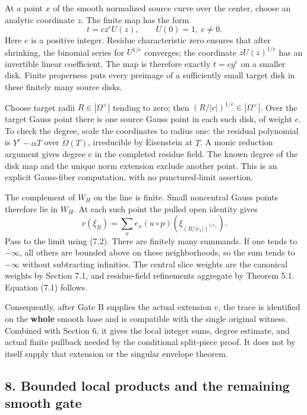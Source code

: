 \documentclass[
  10pt,
]{article}
\begin{document}
At a point \(x\) of the smooth normalized source curve over the center,
choose an analytic coordinate \(z\). The finite map has the form
\[t=c z^e U(z),\qquad U(0)=1,\ c\ne0.\] Here \(e\) is a positive
integer. Residue characteristic zero ensures that after shrinking, the
binomial series for \(U^{1/e}\) converges; the coordinate
\(zU(z)^{1/e}\) has an invertible linear coefficient. The map is
therefore exactly \(t=cy^e\) on a smaller disk. Finite properness puts
every preimage of a sufficiently small target disk in these finitely
many source disks.

Choose target radii \(R\in|\Omega^\times|\) tending to zero; then
\((R/|c|)^{1/e}\in|\Omega^\times|\). Over the target Gauss point there
is one source Gauss point in each such disk, of weight \(e\). To check
the degree, scale the coordinates to radius one: the residual polynomial
is \(Y^e-\alpha T\) over \(\widetilde\Omega(T)\), irreducible by
Eisenstein at \(T\). A monic reduction argument gives degree \(e\) in
the completed residue field. The known degree of the disk map and the
unique norm extension exclude another point. This is an explicit
Gauss-fiber computation, with no punctured-limit assertion.

The complement of \(W_H\) on the line is finite. Small noncentral Gauss
points therefore lie in \(W_H\). At each such point the pulled open
identity gives
\[v(\xi_R)=\sum_x e_x (u\circ p)(\xi_{(R/|c_x|)^{1/e_x}}).\tag{7.3}\]
Pass to the limit using (7.2). There are finitely many summands. If one
tends to \(-\infty\), all others are bounded above on these
neighborhoods, so the sum tends to \(-\infty\) without subtracting
infinities. The central slice weights are the canonical weights by
Section 7.1, and residue-field refinements aggregate by Theorem 5.1.
Equation (7.1) follows.

Consequently, after Gate B supplies the actual extension \(v\), the
trace is identified on the \textbf{whole} smooth base and is compatible
with the single original witness. Combined with Section 6, it gives the
local integer sums, degree estimate, and actual finite pullback needed
by the conditional split-piece proof. It does not by itself supply that
extension or the singular envelope theorem.

\subsection{8. Bounded local products and the remaining smooth
gate}\label{bounded-local-products-and-the-remaining-smooth-gate}
\end{document}

